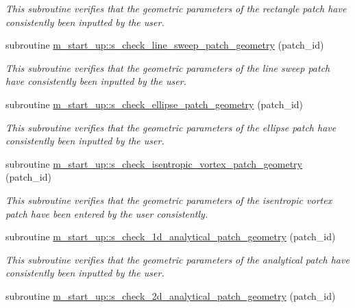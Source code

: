\begin{DoxyCompactItemize}
\begin{DoxyCompactList}\small\item\em This subroutine verifies that the geometric parameters of the rectangle patch have consistently been inputted by the user. \end{DoxyCompactList}\item 
subroutine \hyperlink{namespacem__start__up_af838464749f53bf064afdba3c261ac83}{m\+\_\+start\+\_\+up\+::s\+\_\+check\+\_\+line\+\_\+sweep\+\_\+patch\+\_\+geometry} (patch\+\_\+id)
\begin{DoxyCompactList}\small\item\em This subroutine verifies that the geometric parameters of the line sweep patch have consistently been inputted by the user. \end{DoxyCompactList}\item 
subroutine \hyperlink{namespacem__start__up_a51ddc16cb3379a50fbf2957e47dbb7d5}{m\+\_\+start\+\_\+up\+::s\+\_\+check\+\_\+ellipse\+\_\+patch\+\_\+geometry} (patch\+\_\+id)
\begin{DoxyCompactList}\small\item\em This subroutine verifies that the geometric parameters of the ellipse patch have consistently been inputted by the user. \end{DoxyCompactList}\item 
subroutine \hyperlink{namespacem__start__up_a3fe683c4126d72deba7f8daf1ad83b94}{m\+\_\+start\+\_\+up\+::s\+\_\+check\+\_\+isentropic\+\_\+vortex\+\_\+patch\+\_\+geometry} (patch\+\_\+id)
\begin{DoxyCompactList}\small\item\em This subroutine verifies that the geometric parameters of the isentropic vortex patch have been entered by the user consistently. \end{DoxyCompactList}\item 
subroutine \hyperlink{namespacem__start__up_a2c3f4c2fe04814a924bff26228516a39}{m\+\_\+start\+\_\+up\+::s\+\_\+check\+\_\+1d\+\_\+analytical\+\_\+patch\+\_\+geometry} (patch\+\_\+id)
\begin{DoxyCompactList}\small\item\em This subroutine verifies that the geometric parameters of the analytical patch have consistently been inputted by the user. \end{DoxyCompactList}\item 
subroutine \hyperlink{namespacem__start__up_a0acb93e848d6dd38e617d4870a9b9261}{m\+\_\+start\+\_\+up\+::s\+\_\+check\+\_\+2d\+\_\+analytical\+\_\+patch\+\_\+geometry} (patch\+\_\+id)

\end{DoxyCompactItemize}
